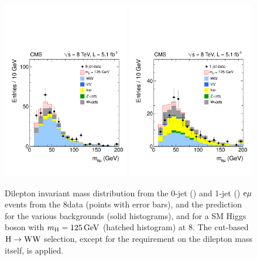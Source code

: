 \documentclass[12pt,twoside,a4paper,cmspaper,final,collab]{cms-tdr}
\begin{document}
\begin{figure}[h!t]
\begin{center}
   \includegraphics[width=0.49\textwidth]{figures/hww_hwwsel_0j_mh125_massem.pdf}
   \includegraphics[width=0.49\textwidth]{figures/hww_hwwsel_1j_mh125_massem.pdf}
	\caption{Dilepton invariant mass distribution from
	the 0-jet (\cmsLeft) and 1-jet (\cmsRight) $\mathrm{e}\mu$ events from the 8\TeV data (points with error bars),
        and the prediction for the various backgrounds (solid histograms), and for a SM Higgs boson
        with $m_{\mathrm{H}}=125\,\text{Ge\hspace{-.08em}V}$ (hatched histogram) at 8\TeV.
       The cut-based $\mathrm{H} \to \mathrm{W}\mathrm{W}$ selection, except for the requirement on the dilepton mass itself,
       is applied.}  \label{fig:hwwsel_nj_mh125_massem}
\end{center}
\end{figure}
\end{document}
